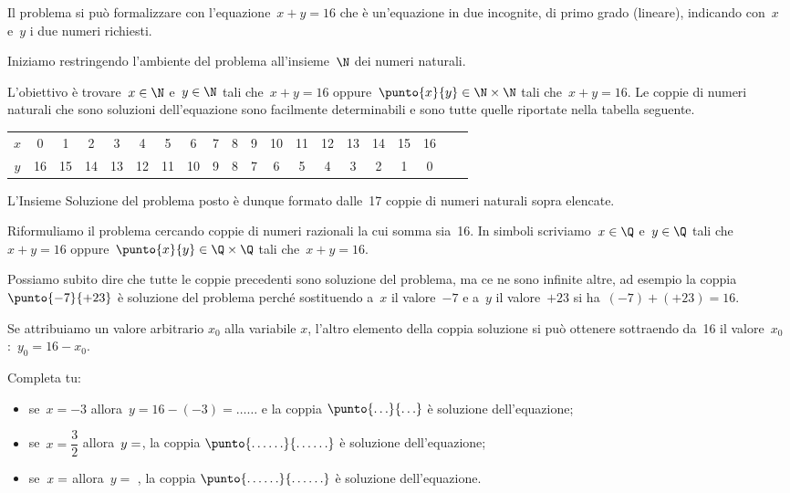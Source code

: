 \begin{soluzione}
Il problema si può formalizzare con l'equazione~\(x+y=16\) che è un'equazione 
in due incognite, di primo grado (lineare), 
indicando con~\(x\) e~\(y\) i due numeri richiesti.

Iniziamo restringendo l'ambiente del problema all'insieme~\(\N\) dei numeri 
naturali.

L'obiettivo è trovare~\(x\in\N\) e~\(y\in\N\) tali che~\(x+y=16\) 
oppure~\(\punto{x}{y}\in\N\times\N\) tali che~\(x+y=16\).
Le coppie di numeri naturali che sono soluzioni
dell'equazione sono facilmente determinabili e sono
tutte quelle riportate nella tabella seguente.

\begin{tabular}{cccccccccccccccccccc}
\toprule
\(x\) & 0 & 1 & 2 & 3 & 4 & 5 & 6 & 7 & 8 & 9 & 10 & 11 & 12 & 13 & 14 & 15 & 
16\\
\(y\) & 16 & 15 & 14 & 13 & 12 & 11 & 10 & 9 & 8 & 7 & 6 & 5 & 4 & 3 & 2 & 1& 
0\\
\bottomrule
\end{tabular}

L'Insieme Soluzione del problema posto è dunque
formato dalle~17 coppie di numeri naturali sopra elencate.

Riformuliamo il problema cercando coppie di numeri razionali la cui
somma sia~16.
In simboli scriviamo~\(x\in\Q\) e~\(y\in\Q\) tali che~\(x+y=16\) 
oppure~\(\punto{x}{y}\in\Q\times\Q\) tali che~\(x+y=16\).

Possiamo subito dire che tutte le coppie precedenti sono soluzione del
problema, ma ce ne sono infinite altre, ad esempio la 
coppia~\(\punto{-7}{+23}\) è 
soluzione del problema perché sostituendo a~\(x\) il
valore~\(-7\) e a~\(y\) il valore~\(+23\) si ha~\((-7)+(+23)=16\).

Se attribuiamo un valore arbitrario \(x_0\) alla variabile \(x\), l'altro
elemento della coppia soluzione si può ottenere sottraendo da~16 il
valore~\(x_0\):~\(y_0=16-x_0\).

Completa tu:

\begin{itemize} [nosep]
\item se~\(x=-3\) allora~\(y=16-(-3)=\ldots\ldots\) e la coppia 
\(\punto{\ldots}{\ldots}\) è soluzione dell'equazione;
\item se~\(x=\dfrac{3}{2}\) allora~\(y =\dotfill\), la coppia 
\(\punto{\ldots\ldots}{\ldots\ldots}\) è soluzione dell'equazione;
\item se~\(x =\dotfill\) allora~\(y=\) \dotfill, la coppia 
\(\punto{\ldots\ldots}{\ldots\ldots}\) è soluzione dell'equazione.
\end{itemize}


\end{soluzione}
